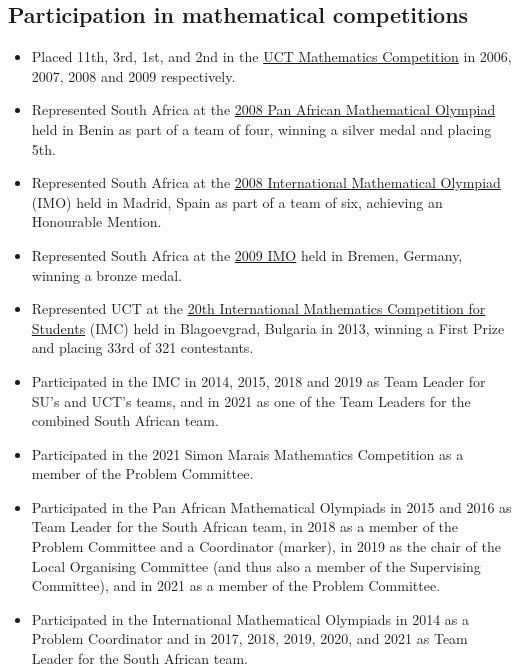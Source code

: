 \documentclass{article}
\begin{document}
\subsection{Participation in mathematical competitions}
\begin{itemize}
	\item Placed 11th, 3rd, 1st, and 2nd in the \href{http://www.mth.uct.ac.za/competition/}{UCT Mathematics Competition} in 2006, 2007, 2008 and 2009 respectively.
	\item Represented South Africa at the \href{http://www.pamo-official.org/en/opam_infos_annee.php?annee=2008&edition=18}{2008 Pan African Mathematical Olympiad} held in Benin as part of a team of four, winning a silver medal and placing 5th.
	\item Represented South Africa at the \href{http://www.imo-2008.es/}{2008 International Mathematical Olympiad} (IMO) held in Madrid, Spain as part of a team of six, achieving an Honourable Mention.
	\item Represented South Africa at the \href{http://www.imo-official.org/year_info.aspx?year=2009}{2009 IMO} held in Bremen, Germany, winning a bronze medal.
	\item Represented UCT at the \href{http://www.imc-math.org.uk/index.php?year=2013}{20th International Mathematics Competition for Students} (IMC) held in Blagoevgrad, Bulgaria in 2013, winning a First Prize and placing 33rd of 321 contestants.
	\item Participated in the IMC in 2014, 2015, 2018 and 2019 as Team Leader for SU's and UCT's teams, and in 2021 as one of the Team Leaders for the combined South African team.
	\item Participated in the 2021 Simon Marais Mathematics Competition as a member of the Problem Committee.
	\item Participated in the Pan African Mathematical Olympiads in 2015 and 2016 as Team Leader for the South African team, in 2018 as a member of the Problem Committee and a Coordinator (marker), in 2019 as the chair of the Local Organising Committee (and thus also a member of the Supervising Committee), and in 2021 as a member of the Problem Committee.
	\item Participated in the International Mathematical Olympiads in 2014 as a Problem Coordinator and in 2017, 2018, 2019, 2020, and 2021 as Team Leader for the South African team.
\end{itemize}

\newpage
\end{document}
